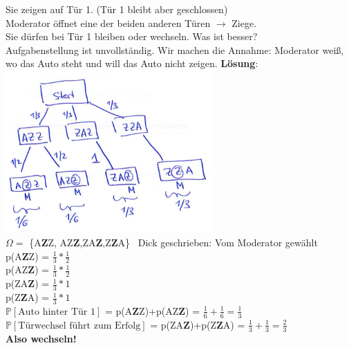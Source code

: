 Sie zeigen auf Tür 1. (Tür 1 bleibt aber geschlossen)\\
Moderator öffnet eine der beiden anderen Türen $\rightarrow$ Ziege.\\
Sie dürfen bei Tür 1 bleiben oder wechseln. Was ist besser?\smallskip\\
Aufgabenstellung ist unvollständig. Wir machen die Annahme: Moderator weiß, wo das Auto steht und will das Auto nicht zeigen.\newpage
\textbf{Lösung}: \\\includegraphics[width=0.6\textwidth]{img/ziege.PNG}\\
$\Omega =$ \{A\textbf{Z}Z, AZ\textbf{Z},ZA\textbf{Z},Z\textbf{Z}A\}\ \hspace{ 1cm} Dick geschrieben: Vom Moderator  gewählt \medskip\\
p(A\textbf{Z}Z) = $\frac{1}{3}*\frac{1}{2}$\smallskip\\
p(AZ\textbf{Z}) = $\frac{1}{3}*\frac{1}{2}$\smallskip\\
p(ZA\textbf{Z}) = $\frac{1}{3}*1$\smallskip\\
p(Z\textbf{Z}A) = $\frac{1}{3}*1$\medskip\\
$\mathds{P}[\text{Auto hinter Tür 1}] $ = p(A\textbf{Z}Z)+p(AZ\textbf{Z}) = $\frac{1}{6}+\frac{1}{6}=\frac{1}{3}$\\
$\mathds{P}[\text{Türwechsel führt zum Erfolg}]$ = p(ZA\textbf{Z})+p(Z\textbf{Z}A) = $\frac{1}{3}+\frac{1}{3}= \frac{2}{3}$\medskip\\
\textbf{Also wechseln!}

